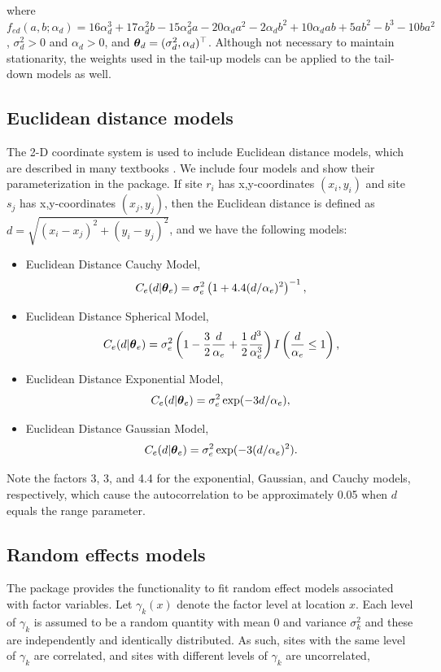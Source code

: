 \documentclass[nojss]{jss}
\def\btheta{\mbox{\boldmath $\theta$}}
\begin{document}
where $f_{ed}(a,b;\alpha_d)=16\alpha_d^3 + 17\alpha_d^2b - 15\alpha_d^2a - 20\alpha_da^2 - 2\alpha_db^2 + 10\alpha_dab + 5ab^2 - b^3 - 10ba^2$, $\sigma^2_d > 0$ and $\alpha_d > 0$, and $\btheta_d = (\sigma^2_d,\alpha_d)^\top$.  Although not necessary to maintain stationarity, the weights used in the tail-up models can be applied to the tail-down models as well.


\subsection{Euclidean distance models}\label{EucDist}

The 2-D coordinate system is used to include Euclidean distance
models, which are described in many textbooks
\citep*[e.g.,][]{Cres:stat:1993,Chil:Delf:geos:1999}.  We include four
models and show their parameterization in the  package.  If
site $r_i$ has x,y-coordinates $(x_i,y_i)$ and site $s_j$ has
x,y-coordinates $(x_j,y_j)$, then the Euclidean distance is defined as
$d=\sqrt{(x_i-x_j)^2+(y_i-y_j)^2}$, and we have the following models:

\begin{itemize}
\item Euclidean Distance Cauchy Model,
  \[
  C_e(d|\btheta_e)=
  \sigma^2_e\left(1 + 4.4(d/\alpha_e)^2\right)^{-1},
  \]
\item Euclidean Distance Spherical Model,
  \[
  C_e(d|\btheta_e)=
  \sigma^2_e\left(1-\frac{3}{2}\frac{d}{\alpha_e}+\frac{1}{2}\frac{d^3}{\alpha_e^3}
  \right)I\left(\frac{d}{\alpha_e}\leq 1\right),
  \]
\item Euclidean Distance Exponential Model,
  \[
  C_e(d|\btheta_e)=
  \sigma^2_e\exp(-3d/\alpha_e),
  \]
\item Euclidean Distance Gaussian Model,
  \[
  C_e(d|\btheta_e)=
  \sigma^2_e\exp(-3(d/\alpha_e)^2).
  \]
\end{itemize}
Note the factors 3, 3, and 4.4 for the exponential, Gaussian, and
Cauchy models, respectively, which cause the autocorrelation to be
approximately 0.05 when $d$ equals the range parameter.

\subsection{Random effects models}

The  package provides the functionality to fit random effect
models associated with factor variables. Let $\gamma_k(x)$ denote the
factor level at location $x$. Each level of $\gamma_k$ is assumed to
be a random quantity with mean 0 and variance $\sigma^2_k$ and these
are independently and identically distributed. As such, sites with the
same level of $\gamma_k$ are correlated, and sites with different
levels of $\gamma_k$ are uncorrelated,
\end{document}
